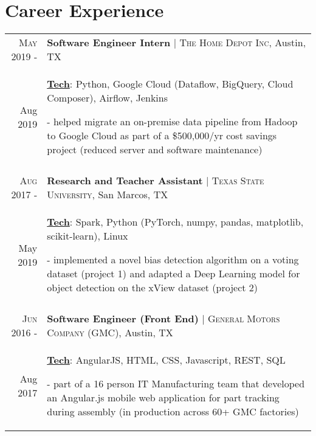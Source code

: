 \documentclass[a4paper,10pt]{article}
\begin{document}
\section{Career Experience}
\begin{tabular}{r|p{12cm}}

\textsc{May 2019 -} & \textbf{Software Engineer Intern} | \textsc{The Home Depot Inc}, Austin, TX \\
Aug 2019 & \small{
	\textbf{\underline{Tech}}: Python, Google Cloud (Dataflow, BigQuery, Cloud Composer), Airflow, Jenkins}

	\tiny{
	\vphantom{a}
	}
	
	\small{
	- helped migrate an on-premise data pipeline from Hadoop to Google Cloud as part of a \$500,000/yr cost savings project (reduced server and software maintenance) } \\
 \multicolumn{2}{c}{} \\

\textsc{Aug 2017 -} & \textbf{Research and Teacher Assistant} | \textsc{Texas State University}, San Marcos, TX \\
May 2019 & \small{
	\textbf{\underline{Tech}}: Spark, Python (PyTorch, numpy, pandas, matplotlib, scikit-learn), Linux
	}

	\tiny{
	\vphantom{a}
	}

	\small{
	
	- implemented a novel bias detection algorithm on a voting dataset (project 1) and adapted a Deep Learning model for object detection on the xView dataset (project 2)	} \\
 \multicolumn{2}{c}{} \\


 \textsc{Jun 2016 -} & \textbf{Software Engineer (Front End)} | \textsc{General Motors Company (GMC)}, Austin, TX \\
Aug 2017 & \small{
	\textbf{\underline{Tech}}: AngularJS, HTML, CSS, Javascript, REST, SQL}

	\tiny{
	\vphantom{a}
	}
	
	\small{
	- part of a 16 person IT Manufacturing team that developed an Angular.js mobile web application for part tracking during assembly (in production across 60+ GMC factories)} \\
\end{tabular}


\end{document}
